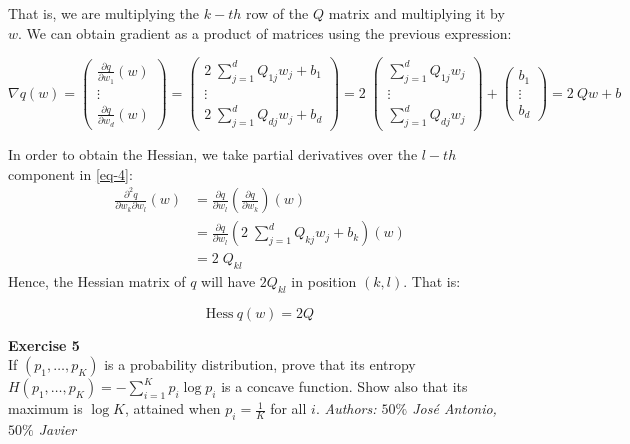 \documentclass[11pt,table]{article}
\newenvironment{problem}[2][Exercise]
{ \begin{mdframed}[backgroundcolor=gray!20] \textbf{#1 #2} \\}
	{\hspace{0.0cm}\newline\newline \emph{Authors: \(50\%\) José Antonio, \(50\%\) Javier}  \end{mdframed}}
\begin{document}
	That is, we are multiplying the \(k-th\) row of the \(Q\) matrix and multiplying it by \(w\). We can obtain gradient as a product of matrices using the previous expression:
	
	\[
	\nabla q(w) = \begin{pmatrix}
		\frac{\partial q}{\partial w_1} (w) \\
		\vdots                              \\
		\frac{\partial q}{\partial w_d} (w)
	\end{pmatrix}
	= \begin{pmatrix}
		2 \; \sum_{j=1}^{d} Q_{1j} w_{j} + b_{1} \\
		\vdots                                   \\
		2 \; \sum_{j=1}^{d} Q_{dj} w_{j} + b_{d}
	\end{pmatrix}
	= 2 \; \begin{pmatrix}
		\sum_{j=1}^{d} Q_{1j} w_{j} \\
		\vdots                      \\
		\sum_{j=1}^{d} Q_{dj} w_{j}
	\end{pmatrix} + \begin{pmatrix}
		b_{1}  \\
		\vdots \\
		b_{d}
	\end{pmatrix}
	= 2 \ Qw + b
	\]
	
	In order to obtain the Hessian, we take partial derivatives over the \(l-th\) component in \ref{eq-4}:
	\begin{align*}
		\frac{\partial^2 q}{\partial w_k \partial w_l} (w) & = \frac{\partial q}{\partial w_l} \left( \frac{\partial q}{\partial w_k} \right) (w)          \\
		& = \frac{\partial q}{\partial w_l} \left( 2 \; \sum_{j=1}^{d} Q_{kj} w_{j} + b_{k} \right) (w) \\
		& = 2 \; Q_{kl}
	\end{align*}
	Hence, the Hessian matrix of \(q\) will have \(2 Q_{kl}\) in position \((k, l)\). That is:
	
	\[
	\text{Hess} \ q(w) = 2Q
	\]
	
	\begin{problem}{5}
		If \( (p_1,\dots,p_K) \) is a probability distribution, prove that its entropy \( H(p_1, \dots, p_K) = - \sum_{i=1}^K p_i \log p_i\) is a concave function. Show also that its maximum is \( \log K \), attained when \( p_i = \frac{1}{K}\) for all $i$.
	\end{problem}
	
\end{document}
